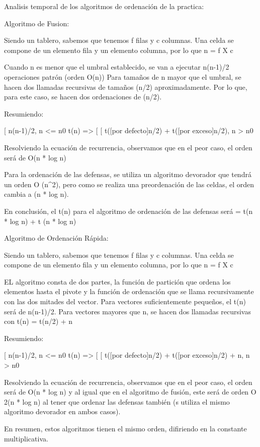 Analisis temporal de los algoritmos de ordenación de la practica:

Algoritmo de Fusion:

Siendo un tablero, sabemos que tenemos f filas y c columnas.
Una celda se compone de un elemento fila y un elemento columna, por lo que
n = f X c

Cuando n es menor que el umbral establecido, se van a ejecutar n(n-1)/2 operaciones patrón (orden O(n))
Para tamaños de n mayor que el umbral, se hacen dos llamadas recursivas de tamaños (n/2) aproximadamente.
Por lo que, para este caso, se hacen dos ordenaciones de (n/2).

Resumiendo:

        
        [ n(n-1)/2,                                   n <= n0                         
t(n) => [                                                    
        [ t([por defecto]n/2) + t([por exceso]n/2),   n > n0 

Resolviendo la ecuación de recurrencia, observamos que en el peor caso, el orden será de O(n * log n)

Para la ordenación de las defensas, se utiliza un algoritmo devorador que tendrá un orden O (n^2), pero
como se realiza una preordenación de las celdas, el orden cambia a (n * log n).

En conclusión, el t(n) para el algoritmo de ordenación de las defensas será = t(n * log n) + t (n * log n)

Algoritmo de Ordenación Rápida:

Siendo un tablero, sabemos que tenemos f filas y c columnas.
Una celda se compone de un elemento fila y un elemento columna, por lo que
n = f X c

EL algoritmo consta de dos partes, la función de partición que ordena los elementos hasta el pivote y
la función de ordenación que se llama recursivamente con las dos mitades del vector. 
Para vectores suficientemente pequeños, el t(n) será de n(n-1)/2.
Para vectores mayores que n, se hacen dos llamadas recursivas con t(n) = t(n/2) + n

Resumiendo:

        
        [ n(n-1)/2,                                       n <= n0                          
t(n) => [                                                    
        [ t([por defecto]n/2) + t([por exceso]n/2) + n,   n > n0 

Resolviendo la ecuación de recurrencia, observamos que en el peor caso, el orden será de O(n * log n) y
al igual que en el algoritmo de fusión, este será de orden O 2(n * log n) al tener que ordenar las defensas también (s
utiliza el mismo algoritmo devorador en ambos casos).


En resumen, estos algoritmos tienen el mismo orden, difiriendo en la constante multiplicativa.
